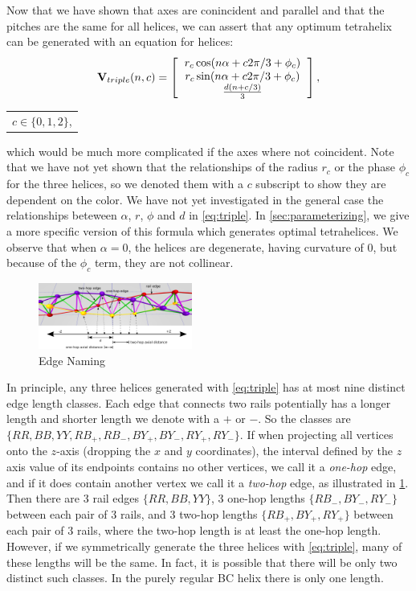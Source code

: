 \documentclass[twocolumn,10pt]{asme2ej}
\renewcommand{\vec}[1]{\mathbf{#1}}
\begin{document}
Now that we have shown that axes are conincident and parallel and that the pitches
are the same for all helices, we can assert that any optimum tetrahelix can
be generated with an equation for helices:
\begin{equation}
\label{eq:triple}
\vec{V}_{triple}(n,c) =
\left [
  \begin{tabular}{c}
   $ r_c \cos(n \alpha +  c 2 \pi /3 + \phi_c)$\\
   $ r_c \sin(n \alpha +  c 2 \pi /3 + \phi_c) $\\
   $ \frac{d(n +c / 3)}{3}   $
  \end{tabular}
  \right ],
\end{equation}
\begin{tabular}{l}
  $c \in \{0,1,2\}$,
  \end{tabular}      
which would be much more complicated if the axes where not coincident.
Note that we have not yet shown that the relationships of the radius $r_c$ or
the phase $\phi_c$ for the three helices, so we denoted them with a $c$ subscript to show
they are dependent on the color.
We have not yet investigated in the general case the relationships beteween
$\alpha$, $r$, $\phi$ and $d$ in \cref{eq:triple}.
In \cref{sec:parameterizing}, we give a more specific version of this formula which
generates optimal tetrahelices.
We observe that when $\alpha = 0$, the helices are degenerate, having curvature of $0$,
but because of the $\phi_c$ term, they are not collinear.


\begin{figure}
  \centering
     \includegraphics[width=0.45\textwidth]{figures/edge-diagram.png}
     \caption{Edge Naming}
  \label{fig:naming}
\end{figure}

In principle, any three helices generated with \cref{eq:triple}
has at most nine distinct edge length classes. Each edge that connects
two rails potentially has a longer length and shorter length we denote with
a $+$ or $-$. So the classes are $\{ RR, BB, YY, RB_+, RB_-, BY_+, BY_-, RY_+, RY_- \}$.
If when projecting all vertices onto the $z$-axis (dropping the $x$ and $y$ coordinates), the interval
defined by the $z$ axis value of its endpoints contains no other vertices,
we call it a \emph{one-hop} edge, and if it does contain another vertex we
call it a \emph{two-hop} edge, as illustrated in \cref{fig:naming}.
Then there are 
3 rail edges $\{ RR, BB, YY\}$,
3 one-hop lengths $\{ RB_-, BY_-, RY_- \}$ between each pair of 3 rails,
and 3 two-hop
lengths $\{ RB_{+}, BY_+, RY_+ \}$ between each pair of 3 rails,
where the two-hop length is at least the one-hop length.
However, if we symmetrically generate the three helices  with \cref{eq:triple},
many of these lengths will be the same.
In fact, it is possible that there
will be only two distinct such classes. In the purely regular BC helix there is only one length.
\end{document}
